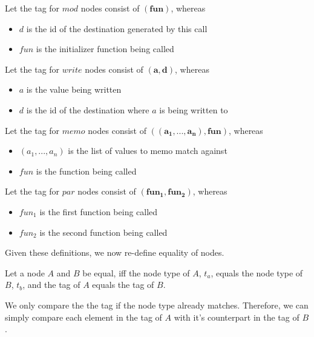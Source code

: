 \begin{definition}
Let the tag for $mod$ nodes consist of $\mathbf{(fun)}$, whereas
\begin{itemize}
\item $d$ is the id of the destination generated by this call
\item $fun$ is the initializer function being called
\end{itemize}
\end{definition}

\begin{definition}
Let the tag for $write$ nodes consist of $\mathbf{(a, d)}$, whereas
\begin{itemize}
\item $a$ is the value being written
\item $d$ is the id of the destination where $a$ is being written to 
\end{itemize}
\end{definition}

\begin{definition}
Let the tag for $memo$ nodes consist of $\mathbf{((a_1, ..., a_n), fun)}$, whereas
\begin{itemize}
\item $(a_1, ..., a_n)$ is the list of values to memo match against
\item $fun$ is the function being called
\end{itemize}
\end{definition}

\begin{definition}
Let the tag for $par$ nodes consist of $\mathbf{(fun_1, fun_2)}$, whereas
\begin{itemize}
\item $fun_1$ is the first function being called
\item $fun_2$ is the second function being called
\end{itemize}
\end{definition}

Given these definitions, we now re-define equality of nodes. 

\begin{definition}
Let a node $A$ and $B$ be equal, iff the node type of $A$, $t_a$, equals the node type of $B$, $t_b$, and the tag of $A$ equals the tag of $B$. 
\end{definition}
We only compare the the tag if the node type already matches. Therefore, we can simply compare each element in the tag of $A$ with it's counterpart in the tag of $B$. 

